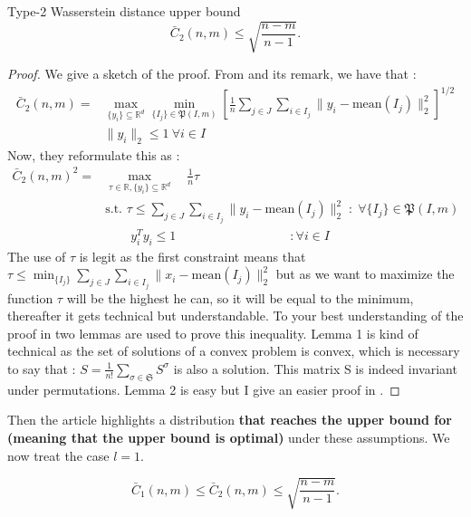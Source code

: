 \documentclass{amsart}
\newcommand{\RR}{\mathbb{R}}
\begin{document}
\begin{theorem} Type-2 Wasserstein distance upper bound
    $$\bar{C}_2\left(n,m \right)\leq \sqrt{\frac{n-m}{n-1}}.$$
\end{theorem}
\begin{proof}
    We give a sketch of the proof. From  and its remark, we have that : 
    \begin{align*}\bar{C}_2\left(n,m\right)=&
        \max_{\{y_i\}\subseteq\RR^d}\min_{\{I_j\}\in\mathfrak{P}\left(I,m\right)}\left[\frac{1}{n}\sum_{j\in J}\sum_{i\in I_j}\lVert y_i-\text{mean}\left(I_j\right)\rVert_2^2\right]^{1/2} \\ &\lVert y_i\rVert_2\leq1 \:\forall i\in I
    \end{align*}
    Now, they reformulate this as : 
    \begin{align*}\bar{C}_2\left(n,m\right)^2=&
        \max_{\tau\in\RR, \{y_i\}\subseteq\RR^d}\quad\frac{1}{n}\tau \\ &\text{s.t. }\tau\leq\sum_{j\in J}\sum_{i\in I_j}\lVert y_i-\text{mean}\left(I_j\right)\rVert_2^2\; :\; \forall \{I_j\}\in\mathfrak{P}\left(I,m\right) \\
        &\quad\quad y_i^Ty_i\leq1 \quad\quad\quad\quad\quad\quad\quad\quad\quad : \forall i\in I
    \end{align*}
    The use of $\tau$ is legit as the first constraint means that $\tau\leq\min_{\{I_j\}}\sum_{j\in J}\sum_{i\in I_j}\lVert x_i-\text{mean}(I_j)\rVert_2^2$ but as we want to maximize the function $\tau$ will be the highest he can, so it will be equal to the minimum, thereafter it gets technical but understandable. To your best understanding of the proof in \cite[Theorem 2]{rujeerapaiboon_scenario_2022} two lemmas are used to prove this inequality. Lemma 1 is kind of technical as the set of solutions of a convex problem is convex, which is necessary to say that : $S=\frac{1}{n!}\sum_{\sigma\in\mathfrak{S}}S^\sigma$ is also a solution. This matrix S is indeed invariant under permutations. Lemma 2 is easy but I give an easier proof in .
\end{proof}

Then the article highlights a distribution \textbf{that reaches the upper bound for (meaning that the upper bound is optimal)} under these assumptions. We now treat the case $l=1$.

\begin{theorem}
    $$\bar{C}_1\left(n,m \right)\leq\bar{C}_2\left(n,m \right) \leq\sqrt{\frac{n-m}{n-1}}.$$
\end{theorem}
\end{document}
